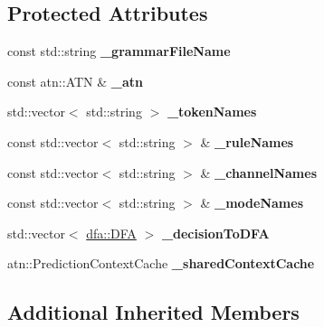 \subsection*{Protected Attributes}
\begin{DoxyCompactItemize}
\item 
\mbox{\label{classantlr4_1_1LexerInterpreter_ac05916f1443e153000e5063462a12923}} 
const std\+::string {\bfseries \+\_\+grammar\+File\+Name}
\item 
\mbox{\label{classantlr4_1_1LexerInterpreter_a81db35b9199d387628898120bd397114}} 
const atn\+::\+A\+TN \& {\bfseries \+\_\+atn}
\item 
\mbox{\label{classantlr4_1_1LexerInterpreter_ae0354e17146808ace719a3314fe1ba81}} 
std\+::vector$<$ std\+::string $>$ {\bfseries \+\_\+token\+Names}
\item 
\mbox{\label{classantlr4_1_1LexerInterpreter_a4d3a6703928b3ea0e9c8a26a40f1d084}} 
const std\+::vector$<$ std\+::string $>$ \& {\bfseries \+\_\+rule\+Names}
\item 
\mbox{\label{classantlr4_1_1LexerInterpreter_a7a9d89dec4478ad258780f8b4f29bf06}} 
const std\+::vector$<$ std\+::string $>$ \& {\bfseries \+\_\+channel\+Names}
\item 
\mbox{\label{classantlr4_1_1LexerInterpreter_abb4ba0539c8495105441045950f0e4e0}} 
const std\+::vector$<$ std\+::string $>$ \& {\bfseries \+\_\+mode\+Names}
\item 
\mbox{\label{classantlr4_1_1LexerInterpreter_aab206048950fac68b9b697a392542af9}} 
std\+::vector$<$ \hyperlink{classantlr4_1_1dfa_1_1DFA}{dfa\+::\+D\+FA} $>$ {\bfseries \+\_\+decision\+To\+D\+FA}
\item 
\mbox{\label{classantlr4_1_1LexerInterpreter_a8cd920aea3322311f1539078e10f96d9}} 
atn\+::\+Prediction\+Context\+Cache {\bfseries \+\_\+shared\+Context\+Cache}
\end{DoxyCompactItemize}
\subsection*{Additional Inherited Members}


